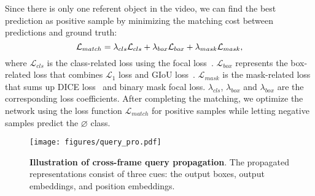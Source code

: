 \documentclass[10pt,twocolumn,letterpaper]{article}
\begin{document}
Since there is only one referent object in the video, we can find the best prediction as positive sample by minimizing the matching cost between predictions and ground truth:
\begin{equation}
\label{eq:match}
\small
\mathcal{L}_{match} =  \lambda_{cls}\mathcal{L}_{cls} + \lambda_{box}\mathcal{L}_{box} + \lambda_{mask}\mathcal{L}_{mask},
\end{equation}
where $\mathcal{L}_{cls}$ is the class-related loss using the focal loss~\cite{lin2017focal}. 
$\mathcal{L}_{box}$ represents the box-related loss that combines $\mathcal{L}_1$ loss and GIoU loss~\cite{rezatofighi2019generalized}.
$\mathcal{L}_{mask}$ is the mask-related loss that sums up DICE loss~\cite{milletari2016v} and binary mask focal loss.
$\lambda_{cls}$, $\lambda_{box}$ and $\lambda_{box}$ are the corresponding loss coefficients.
After completing the matching, we optimize the network using the loss function $\mathcal{L}_{match}$ for positive samples while letting negative samples predict the $\varnothing$ class.



\begin{figure}
\centering
	\texttt{[image: figures/query\_pro.pdf]}
	\vspace{-10pt}
	\caption{\textbf{Illustration of cross-frame query propagation}. The propagated representations consist of three cues: the output boxes, output embeddings, and position embeddings.}
	\vspace{-3mm}
	\label{fig:query_pro}
\end{figure}
\end{document}
